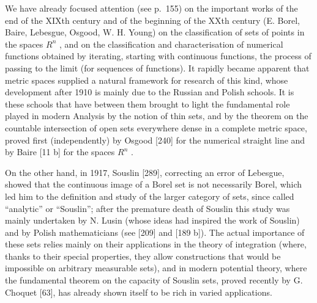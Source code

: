 We have already focused attention (see p.~155) on the important works of the end of the XIXth century and of the beginning of the XXth century (E. Borel, Baire, Lebesgue, Osgood, W. H. Young) on the classification of sets of points in the spaces \(R^{n}\) , and on the classification and characterisation of numerical functions obtained by iterating, starting with continuous functions, the process of passing to the limit (for sequences of functions). It rapidly became apparent that metric spaces supplied a natural framework for research of this kind, whose development after 1910 is mainly due to the Russian and Polish schools. It is these schools that have between them brought to light the fundamental role played in modern Analysis by the notion of thin sets, and by the theorem on the countable intersection of open sets everywhere dense in a complete metric space, proved first (independently) by Osgood {[}240{]} for the numerical straight line and by Baire {[}11 b{]} for the spaces \(R^{n}\) .

On the other hand, in 1917, Souslin {[}289{]}, correcting an error of Lebesgue, showed that the continuous image of a Borel set is not necessarily Borel, which led him to the definition and study of the larger category of sets, since called ``analytic'' or ``Souslin''; after the premature death of Souslin this study was mainly undertaken by N. Lusin (whose ideas had inspired the work of Souslin) and by Polish mathematicians (see {[}209{]} and {[}189 b{]}). The actual importance of these sets relies mainly on their applications in the theory of integration (where, thanks to their special properties, they allow constructions that would be impossible on arbitrary measurable sets), and in modern potential theory, where the fundamental theorem on the capacity of Souslin sets, proved recently by G. Choquet {[}63{]}, has already shown itself to be rich in varied applications.
\relax{}
